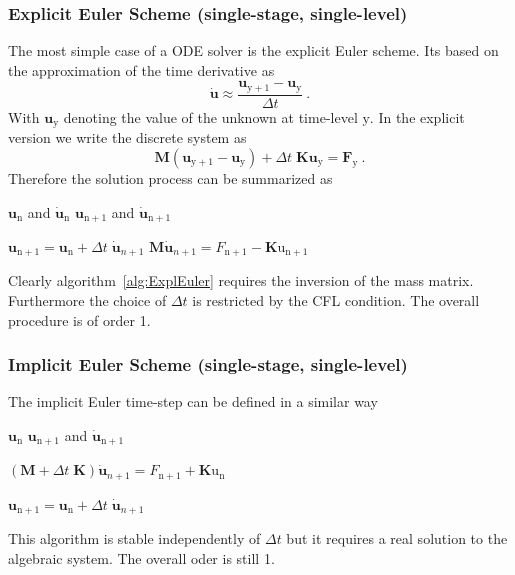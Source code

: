 \subsubsection[Explicit Euler Scheme]{Explicit Euler Scheme (single-stage, single-level)}
The most simple case of a ODE solver is the explicit Euler scheme. Its based on the approximation of
the time derivative as
\begin{equation}
\mathbf{\dot{u}} \approx \frac{\mathbf{u}_{\mathrm{y}+1} - \mathbf{u}_{\mathrm{y}}}{\Delta t}\ .
\end{equation}
With $\mathbf{u}_{\mathrm{y}}$ denoting the value of the unknown at time-level $\mathrm{y}$. In the explicit
version we write the discrete system as
\begin{equation}
\mathbf{M} (\mathbf{u}_{\mathrm{y}+1} - \mathbf{u}_{\mathrm{y}}) + \Delta t \; \mathbf{K} \mathbf{u}_{\mathrm{y}} = \mathbf{F}_{\mathrm{y}}\ .
\end{equation}
Therefore the solution process can be summarized as 
\begin{algorithm}
\caption{Explicit Euler Time-step} \label{alg:ExplEuler}
\begin{algorithmic}
\REQUIRE $\mathbf{u}_{\mathrm{n}}$ and $\mathbf{\dot{u}}_{\mathrm{n}}$
\ENSURE $\mathbf{u}_{\mathrm{n}+1}$ and $\mathbf{\dot{u}}_{\mathrm{n}+1}$


\STATE $\mathbf{u}_{\mathrm{n}+1} = \mathbf{u}_{\mathrm{n}} + \Delta t \; \mathbf{\dot{u}}_{n+1}$
\STATE {}
\STATE $\mathbf{M} \mathbf{\dot{u}}_{n+1} = F_{\mathrm{n}+1} - \mathbf{K} \mathrm{u}_{\mathrm{n}+1}$ 

\end{algorithmic}
\end{algorithm}

Clearly algorithm~\ref{alg:ExplEuler} requires the inversion of the mass matrix. Furthermore the 
choice of $\Delta t$ is restricted by the CFL condition. The overall procedure is of order 1.
\subsubsection[Implicit Euler Scheme]{Implicit Euler Scheme (single-stage, single-level)}
The implicit Euler time-step can be defined in a similar way
\begin{algorithm}
\caption{Implicit Euler Time-step  Effective Mass Formulation} \label{alg:ImplEuler}
\begin{algorithmic}
\REQUIRE $\mathbf{u}_{\mathrm{n}}$
\ENSURE $\mathbf{u}_{\mathrm{n}+1}$ and $\mathbf{\dot{u}}_{\mathrm{n}+1}$

\STATE {}
\STATE $\left( \mathbf{M} + \Delta t\; \mathbf{K} \right) \mathbf{\dot{u}}_{n+1} = F_{\mathrm{n}+1} + \mathbf{K} \mathrm{u}_{\mathrm{n}}$ 

\STATE {}
\STATE $\mathbf{u}_{\mathrm{n}+1} = \mathbf{u}_{\mathrm{n}} + \Delta t \; \mathbf{\dot{u}}_{n+1}$

\end{algorithmic}
\end{algorithm}
This algorithm is stable independently of $\Delta t$ but it requires a real solution to the
algebraic system. The overall oder is still 1.

